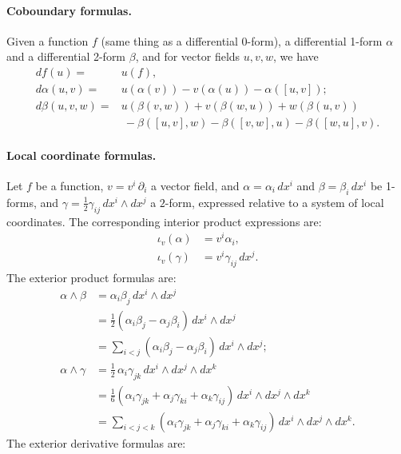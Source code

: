 \documentclass[12pt]{article}
\begin{document}
\paragraph{Coboundary formulas.}  Given a function $f$ (same thing as
a differential $0$-form), a differential 1-form $\alpha$ and a
differential 2-form $\beta$, and for vector fields $u,v,w$, we have
\begin{align*}
  d f(u) =& u(f),\\
  d \alpha(u,v) =& u(\alpha(v)) - v(\alpha(u))-
  \alpha([u,v]);\\
  d \beta(u,v,w) =& u( \beta(v,w)) +v(\beta(w,u)) +
  w(\beta(u,v)) \\ &\ -\beta([u,v],w) - \beta([v,w],u) -
  \beta([w,u],v).
\end{align*}


\paragraph{Local coordinate formulas.} Let $f$ be a function, $v=v^i\,
\partial_i$ a vector field, and $\alpha = \alpha_i\, d x^i$ and $\beta
= \beta_i\, d x^i$ be 1-forms, and $\gamma=\tfrac{1}{2} \gamma_{ij}\,
dx^i \wedge dx^j$ a $2$-form, expressed relative to a system of local
coordinates.  The corresponding interior product expressions are:
\begin{align*}
  \iota_v(\alpha) &= v^i \alpha_i ,\\
  \iota_v(\gamma) &= v^i \gamma_{ij}\, dx^j.
\end{align*}
The exterior product  formulas are:
\begin{align*}
  \alpha\wedge\beta &= \alpha_i \beta_j\, dx^i\wedge dx^j \\
  &=\tfrac{1}{2} (\alpha_i \beta_j - \alpha_j \beta_i)\, d x^i \wedge
  d x^j\\ &= \sum_{i<j} (\alpha_i \beta_j - \alpha_j \beta_i)\, d x^i
  \wedge d x^j;\\
  \alpha\wedge\gamma &= \tfrac{1}{2} \, \alpha_i \gamma_{jk}\,
  dx^i\wedge dx^j\wedge dx^k \\ 
  &=\tfrac{1}{6} (\alpha_i \gamma_{jk} + \alpha_j \gamma_{ki} +
  \alpha_k \gamma_{ij})\, d x^i \wedge
  d x^j \wedge d x^k \\ 
  &=\sum_{i<j<k} (\alpha_i \gamma_{jk} + \alpha_j \gamma_{ki} +
  \alpha_k \gamma_{ij})\, d x^i \wedge
  d x^j \wedge d x^k.
\end{align*}
The exterior derivative formulas are:
\end{document}

